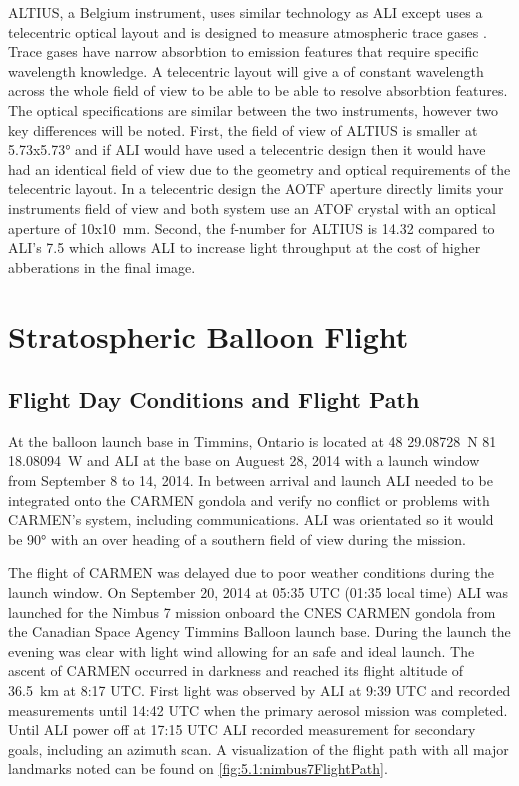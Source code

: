 \documentclass[12pt]{article}
\begin{document}
 ALTIUS, a Belgium instrument, uses similar technology as ALI except uses a telecentric optical layout and is designed to measure atmospheric trace gases \citep{Dekemper2012}. Trace gases have narrow absorbtion to emission features that require specific wavelength knowledge. A telecentric layout will give a of constant wavelength across the whole field of view to be able to be able to resolve absorbtion features. The optical specifications are similar between the two instruments, however two key differences will be noted. First, the field of view of ALTIUS is smaller at 5.73x5.73\si{\degree} and if ALI would have used a telecentric design then it would have had an identical field of view due to the geometry and optical requirements of the telecentric layout. In a telecentric design the AOTF aperture directly limits your instruments field of view and both system use an ATOF crystal with an optical aperture of 10x10~mm. Second, the f-number for ALTIUS is 14.32 compared to ALI's 7.5 which allows ALI to increase light throughput at the cost of higher abberations in the final image.

\section{Stratospheric Balloon Flight}

\subsection{Flight Day Conditions and Flight Path}

At the balloon launch base in Timmins, Ontario is located at 48 29.08728~N 81 18.08094~W and ALI at the base on Auguest 28, 2014 with a launch window from September 8 to 14, 2014. In between arrival and launch ALI needed to be integrated onto the CARMEN gondola and verify no conflict or problems with CARMEN's system, including communications. ALI was orientated so it would be 90\si{\degree} with an over heading of a southern field of view during the mission.

The flight of CARMEN was delayed due to poor weather conditions during the launch window. On September 20, 2014 at 05:35 UTC (01:35 local time) ALI was launched for the Nimbus 7 mission onboard the CNES CARMEN gondola from the Canadian Space Agency Timmins Balloon launch base. During the launch the evening was clear with light wind allowing for an safe and ideal launch. The ascent of CARMEN occurred in darkness and reached its flight altitude of 36.5~km at 8:17 UTC. First light was observed by ALI at 9:39 UTC and recorded measurements until 14:42 UTC when the primary aerosol mission was completed. Until ALI power off at 17:15 UTC ALI recorded measurement for secondary goals, including an azimuth scan. A visualization of the flight path with all major landmarks noted can be found on \autoref{fig:5.1:nimbus7FlightPath}.
\end{document}
